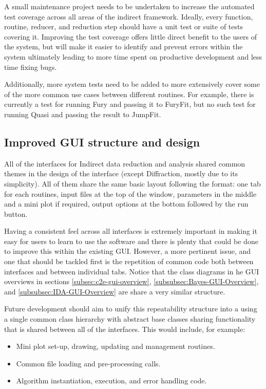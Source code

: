 \documentclass[paper=a4, fontsize=11pt]{scrartcl}	%
\numberwithin{equation}{section}															%
\numberwithin{figure}{section}																%
\numberwithin{table}{section}																%
\begin{document}
A small maintenance project needs to be undertaken to increase the automated test coverage across all areas of the indirect framework. Ideally, every function, routine, reducer, and reduction step should have a unit test or suite of tests covering it. Improving the test coverage offers little direct benefit to the users of the system, but will make it easier to identify and prevent errors within the system ultimately leading to more time spent on productive development and less time fixing bugs.

Additionally, more system tests need to be added to more extensively cover some of the more common use cases between different routines. For example, there is currently a test for running Fury and passing it to FuryFit, but no such test for running Quasi and passing the result to JumpFit.

\subsection{Improved GUI structure and design}
\label{subsec:GUI-Improvements}
All of the interfaces for Indirect data reduction and analysis shared common themes in the design of the interface (except Diffraction, mostly due to its simplicity). All of them share the same basic layout following the format: one tab for each routines, input files at the top of the window, parameters in the middle and a mini plot if required, output options at the bottom followed by the run button.

Having a consistent feel across all interfaces is extremely important in making it easy for users to learn to use the software and there is plenty that could be done to improve this within the existing GUI. However, a more pertinent issue, and one that should be tackled first is the repetition of common code both between interfaces and between individual tabs. Notice that the class diagrams in he GUI overviews in sections \ref{subsec:c2e-gui-overview}, \ref{subsubsec:Bayes-GUI-Overview}, and \ref{subsubsec:IDA-GUI-Overview} are share a very similar structure.

Future development should aim to unify this repeatability structure into a using a single common class hierarchy with abstract base classes sharing functionality that is shared between all of the interfaces. This would include, for example:

\begin{itemize}
\item Mini plot set-up, drawing, updating and management routines.
\item Common file loading and pre-processing calls.
\item Algorithm instantiation, execution, and error handling code.
\end{itemize}
\end{document}
